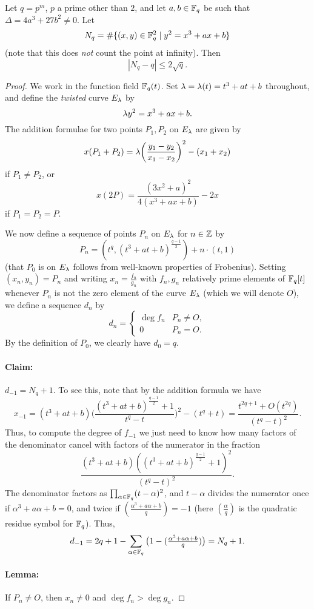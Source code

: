 \begin{thm} Let $q = p^m$, $p$ a prime other than $2$, and let $a,b \in \mathbb{F}_q$ be such that $\Delta = 4a^3+27b^2 \ne 0$. Let
\[
N_q = \#\{(x,y)\in\mathbb{F}_q^2 \mid y^2 = x^3 + ax + b\}
\]
(note that this does \emph{not} count the point at infinity). Then
\[
|N_q - q| \le 2\sqrt{q}.
\]
\end{thm}
\begin{proof} We work in the function field $\mathbb{F}_q(t)$. Set $\lambda = \lambda(t) = t^3+at+b$ throughout, and define the \emph{twisted} curve $E_{\lambda}$ by
\[
\lambda y^2 = x^3 + ax + b.
\]
The addition formulae for two points $P_1, P_2$ on $E_{\lambda}$ are given by
\[
x(P_1 + P_2) = \lambda\bigg(\frac{y_1-y_2}{x_1-x_2}\bigg)^2 - (x_1 + x_2)
\]
if $P_1 \ne P_2$, or
\[
x(2P) = \frac{(3x^2 + a)^2}{4(x^3+ax+b)}-2x
\]
if $P_1 = P_2 = P$.

We now define a sequence of points $P_n$ on $E_{\lambda}$ for $n \in \mathbb{Z}$ by
\[
P_n = (t^q, (t^3 + at + b)^{\frac{q-1}{2}}) + n\cdot(t,1)
\]
(that $P_0$ is on $E_{\lambda}$ follows from well-known properties of Frobenius). Setting $(x_n,y_n) = P_n$ and writing $x_n = \frac{f_n}{g_n}$ with $f_n,g_n$ relatively prime elements of $\mathbb{F}_q[t]$ whenever $P_n$ is not the zero element of the curve $E_{\lambda}$ (which we will denote $O$), we define a sequence $d_n$ by
\[
d_n = \begin{cases}\deg f_n & P_n \ne O,\\ 0 & P_n = O. \end{cases}
\]
By the definition of $P_0$, we clearly have $d_0 = q$.
\paragraph{Claim:} $d_{-1} = N_q + 1$. To see this, note that by the addition formula we have
\[
x_{-1} = (t^3+at+b)\bigg(\frac{(t^3+at+b)^{\frac{q-1}{2}}+1}{t^q-t}\bigg)^2 - (t^q + t) = \frac{t^{2q+1}+O(t^{2q})}{(t^q-t)^2}.
\]
Thus, to compute the degree of $f_{-1}$ we just need to know how many factors of the denominator cancel with factors of the numerator in the fraction
\[
\frac{(t^3+at+b)((t^3+at+b)^{\frac{q-1}{2}}+1)^2}{(t^q-t)^2}.
\]
The denominator factors as $\prod_{\alpha\in\mathbb{F}_q} (t-\alpha)^2$, and $t-\alpha$ divides the numerator once if $\alpha^3 + a\alpha + b = 0$, and twice if $(\frac{\alpha^3+a\alpha+b}{q}) = -1$ (here $(\frac{\alpha}{q})$ is the quadratic residue symbol for $\mathbb{F}_q$). Thus,
\[
d_{-1} = 2q+1 - \sum_{\alpha\in\mathbb{F}_q}\big(1-(\tfrac{\alpha^3+a\alpha+b}{q})\big) = N_q + 1.
\]
\paragraph{Lemma:} If $P_n \ne O$, then $x_n \ne 0$ and $\deg f_n > \deg g_n$.

\end{proof}
